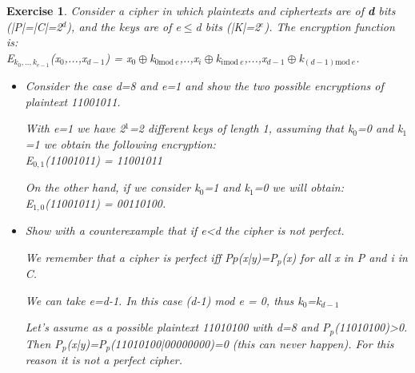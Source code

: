 \documentclass[a4paper, 12pt]{report}
\newtheorem{exercise}{\textbf{Exercise}}
\begin{document}
\begin{exercise}
	Consider a cipher in which plaintexts and ciphertexts are of \textbf{d} bits (|P|=|C|=2$^d$), and the keys are of e$\le$d bits (|K|=2$^e$). The encryption function is:\\
	E$_{k_0,..,k_{e-1}}$(x$_0$,...,x$_{d-1}$) = x$_0\oplus$k$_{0 \text{mod} \ e}$,..,x$_i\oplus$k$_{i \text{mod} \ e}$,...,x$_{d-1}\oplus$k$_{(d-1) \text{mod} \ e}$.
	
	\begin{itemize}
		\item Consider the case d=8 and e=1 and show the two possible encryptions of plaintext 11001011.
		
		With e=1 we have 2$^1$=2 different keys of length 1, assuming that k$_0$=0 and k$_1$=1 we obtain the following encryption:\\
		E$_{0,1}$(11001011) = 11001011
		
		On the other hand, if we consider k$_0$=1 and k$_1$=0 we will obtain:\\
		E$_{1,0}$(11001011) = 00110100.
		\item Show with a counterexample that if e<d the cipher is not perfect.
		
		We remember that a cipher is perfect iff P$p$(x|y)=P$_p$(x) for all x in P and i in C.
		
		We can take e=d-1. In this case (d-1) mod \textit{e} = 0, thus k$_0$=k$_{d-1}$
		
		Let's assume as a possible plaintext 11010100 with d=8 and P$_p$(11010100)>0. Then
		P$_p$(x|y)=P$_p$(11010100|00000000)=0 (this can never happen). For this reason it is not a perfect cipher.
	\end{itemize}
\end{exercise}
\end{document}
